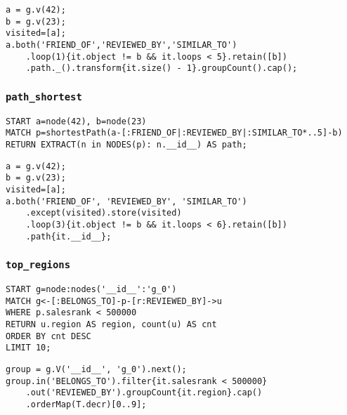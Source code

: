 \begin{lstlisting}
a = g.v(42);
b = g.v(23);
visited=[a];
a.both('FRIEND_OF','REVIEWED_BY','SIMILAR_TO')
	.loop(1){it.object != b && it.loops < 5}.retain([b])
	.path._().transform{it.size() - 1}.groupCount().cap();
\end{lstlisting}

\subsubsection*{\texttt{path\_shortest}}

\begin{lstlisting}
START a=node(42), b=node(23)
MATCH p=shortestPath(a-[:FRIEND_OF|:REVIEWED_BY|:SIMILAR_TO*..5]-b)
RETURN EXTRACT(n in NODES(p): n.__id__) AS path;
\end{lstlisting}

\begin{lstlisting}
a = g.v(42);
b = g.v(23);
visited=[a];
a.both('FRIEND_OF', 'REVIEWED_BY', 'SIMILAR_TO')
	.except(visited).store(visited)
	.loop(3){it.object != b && it.loops < 6}.retain([b])
	.path{it.__id__};
\end{lstlisting}

\subsubsection*{\texttt{top\_regions}}

\begin{lstlisting}
START g=node:nodes('__id__':'g_0')
MATCH g<-[:BELONGS_TO]-p-[r:REVIEWED_BY]->u
WHERE p.salesrank < 500000
RETURN u.region AS region, count(u) AS cnt
ORDER BY cnt DESC
LIMIT 10;
\end{lstlisting}

\begin{lstlisting}
group = g.V('__id__', 'g_0').next();
group.in('BELONGS_TO').filter{it.salesrank < 500000}
	.out('REVIEWED_BY').groupCount{it.region}.cap()
	.orderMap(T.decr)[0..9];
\end{lstlisting}

